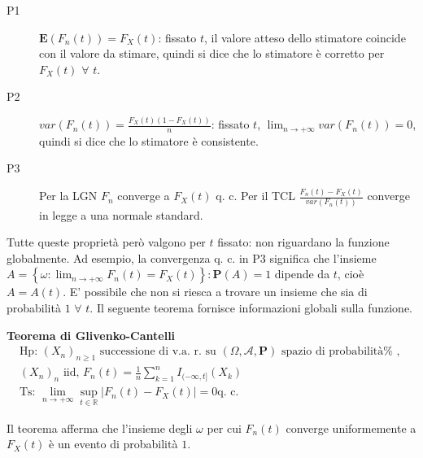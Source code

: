 \documentclass{article}
\begin{document}
\begin{description}
\item[P1] $\mathbf{E}\left( F_{n}\left( t\right) \right) =F_{X}\left(
t\right) $: fissato $t$, il valore atteso dello stimatore coincide con il
valore da stimare, quindi si dice che lo stimatore \`{e} corretto per $%
F_{X}\left( t\right) $ $\forall $ $t$.

\item[P2] $var\left( F_{n}\left( t\right) \right) =\frac{F_{X}\left(
t\right) \left( 1-F_{X}\left( t\right) \right) }{n}$: fissato $t$, $%
\lim_{n\rightarrow +\infty }var\left( F_{n}\left( t\right) \right) =0$,
quindi si dice che lo stimatore \`{e} consistente.

\item[P3] Per la LGN $F_{n}$ converge a $F_{X}\left( t\right) $ q. c. Per il
TCL $\frac{F_{n}\left( t\right) -F_{X}\left( t\right) }{var\left(
F_{n}\left( t\right) \right) }$ converge in legge a una normale standard.
\end{description}

Tutte queste propriet\`{a} per\`{o} valgono per $t$ fissato: non riguardano
la funzione globalmente. Ad esempio, la convergenza q. c. in P3 significa
che l'insieme $A=\left\{ \omega :\lim_{n\rightarrow +\infty }F_{n}\left(
t\right) =F_{X}\left( t\right) \right\} :\mathbf{P}\left( A\right) =1$
dipende da $t$, cio\`{e} $A=A\left( t\right) $. E' possibile che non si
riesca a trovare un insieme che sia di probabilit\`{a} $1$ $\forall $ $t$.
Il seguente teorema fornisce informazioni globali sulla funzione.

\textbf{Teorema di Glivenko-Cantelli}
\begin{gather*}
\text{Hp: }\left( X_{n}\right) _{n\geq 1}\text{ successione di v.a. r. su }%
\left( \Omega ,\mathcal{A},\mathbf{P}\right) \text{ spazio di probabilit\`{a}%
, } \\
\left( X_{n}\right) _{n}\text{ iid, }F_{n}\left( t\right) =\frac{1}{n}%
\sum_{k=1}^{n}I_{(-\infty ,t]}\left( X_{k}\right) \\
\text{Ts: }\lim_{n\rightarrow +\infty }\sup_{t\in 
\mathbb{R}
}\left\vert F_{n}\left( t\right) -F_{X}\left( t\right) \right\vert =0\text{
q. c. }
\end{gather*}

Il teorema afferma che l'insieme degli $\omega $ per cui $F_{n}\left(
t\right) $ converge uniformemente a $F_{X}\left( t\right) $ \`{e} un evento
di probabilit\`{a} $1$.
\end{document}
